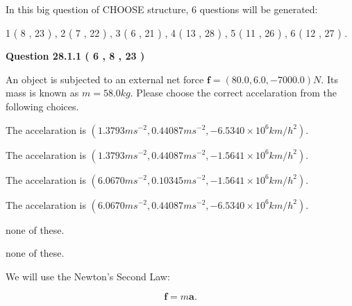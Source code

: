 \documentclass[12pt]{article}
\begin{document}
   
\vspace{0.2in}
   
 In this big question of CHOOSE structure,            6  questions will be generated: 
  
  
             1 (           8 ,          23 )
 ,
             2 (           7 ,          22 )
 ,
             3 (           6 ,          21 )
 ,
             4 (          13 ,          28 )
 ,
             5 (          11 ,          26 )
 ,
             6 (          12 ,          27 )
 .
  
\vspace{0.2in}
  
{\textbf{\Large{Question
28.1.1 
 (           6 ,           8 ,          23 )
}}}
  
  
 
An object is subjected to an external net force $\mathbf{f}=(
80.0 ,
6.0,
-7000.0  )N$. Its mass is known as
$m= %
58.0  kg$. Please choose the correct accelaration
from the following choices.
 
 
 
The accelaration is
$(
1.3793ms^{-2},
0.44087ms^{-2},
-6.5340 \times 10^{6}km/h^2
).
$
 
 
The accelaration is
$(
1.3793ms^{-2},
0.44087ms^{-2},
-1.5641 \times 10^{6}km/h^2
).
$
 
 
The accelaration is
$(
6.0670ms^{-2},
0.10345ms^{-2},
-1.5641 \times 10^{6}km/h^2
).
$
 
 
The accelaration is
$(
6.0670ms^{-2},
0.44087ms^{-2},
-6.5340 \times 10^{6}km/h^2
).
$
 
 
none of these.
 
 
\noindent{}
 
 
none of these.
 
 
\noindent{}
 
 
 
 
 
 
\noindent{}
 
 

We will use the Newton's Second Law:
 
\[
\mathbf{f}=m\mathbf{a}.
\]
 
\end{document}
